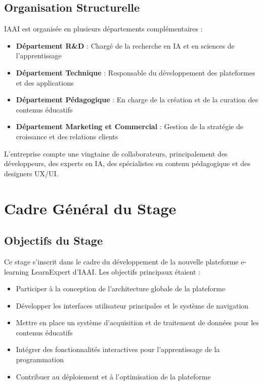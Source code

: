 \subsection{Organisation Structurelle}
IAAI est organisée en plusieurs départements complémentaires :
\begin{itemize}
  \item \textbf{Département R\&D} : Chargé de la recherche en IA et en sciences de l'apprentissage
  \item \textbf{Département Technique} : Responsable du développement des plateformes et des applications
  \item \textbf{Département Pédagogique} : En charge de la création et de la curation des contenus éducatifs
  \item \textbf{Département Marketing et Commercial} : Gestion de la stratégie de croissance et des relations clients
\end{itemize}

L'entreprise compte une vingtaine de collaborateurs, principalement des développeurs, des experts en IA, des spécialistes en contenu pédagogique et des designers UX/UI.

\section{Cadre Général du Stage}

\subsection{Objectifs du Stage}
Ce stage s'inscrit dans le cadre du développement de la nouvelle plateforme e-learning LearnExpert d'IAAI. Les objectifs principaux étaient :

\begin{itemize}
  \item Participer à la conception de l'architecture globale de la plateforme
  \item Développer les interfaces utilisateur principales et le système de navigation
  \item Mettre en place un système d'acquisition et de traitement de données pour les contenus éducatifs
  \item Intégrer des fonctionnalités interactives pour l'apprentissage de la programmation
  \item Contribuer au déploiement et à l'optimisation de la plateforme
\end{itemize}

